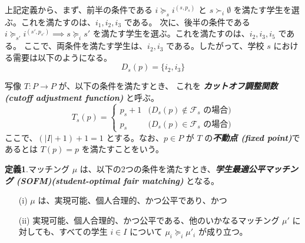 \documentclass[12pt, a4paper]{article}
\theoremstyle{definition}
\theoremstyle{remark}
\theoremstyle{plain}
\begin{document}
上記定義から、まず、前半の条件である \( i \succeq_s i^{(s,p_s)} \) と \( s \succ_i \emptyset \) を満たす学生を選ぶ。これを満たすのは、\( i_1, i_2, i_3 \) である。
次に、後半の条件である \( i \succeq_{s'} i^{(s',p_{s'})} \implies s \succeq_i s' \) を満たす学生を選ぶ。これを満たすのは、\( i_2, i_3, i_5 \) である。
ここで、両条件を満たす学生は、\( i_2, i_3 \) である。したがって、学校 \( s \) における需要は以下のようになる。
\[
D_s(p) = \{i_2, i_3\}
\]




写像 $T: P \to P$ が、以下の条件を満たすとき、
これを \textbf{\textit{カットオフ調整関数 (cutoff adjustment function)}} と呼ぶ。
\[
    T_s(p) =
    \begin{cases}
        p_s + 1 & \text{($D_s(p) \notin \mathcal{F}_s$ の場合)} \\
        p_s     & \text{($D_s(p) \in \mathcal{F}_s$ の場合)}
    \end{cases}
\]
ここで、\( (|I| + 1) + 1 = 1 \) とする。なお、$p\in P$ が $T$ の\textbf{\textit{不動点 (fixed point)}}であるとは $T(p)=p$ を満たすことをいう。


\textbf{定義1}.マッチング $\mu$ は、以下の2つの条件を満たすとき、\textbf{\textit{学生最適公平マッチング (SOFM)(student-optimal fair matching) }} となる。
\begin{itemize}
    \item[(i)] $\mu$ は、実現可能、個人合理的、かつ公平であり、かつ
    \item[(ii)] 実現可能、個人合理的、かつ公平である、他のいかなるマッチング $\mu'$ に対しても、すべての学生 $i \in I$ について $\mu_i \succeq_i \mu'_i$ が成り立つ。
\end{itemize}
\end{document}

